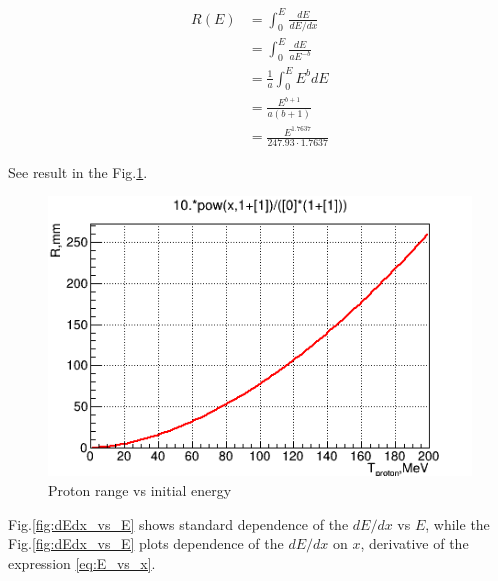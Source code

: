 \documentclass[english]{article}
\makeatletter
\def\ScaleIfNeeded{%
\ifdim\Gin@nat@width>\linewidth
\linewidth
\else
\Gin@nat@width
\fi
}
\makeatother
\begin{document}
\begin{align*}
R(E) &= \int_0^E \frac{dE}{dE/dx} \\
&= \int_0^E\frac{dE}{aE^{-b}} \\
&= \frac{1}{a} \int_0^E E^b dE \\
&= \frac{E^{b+1}}{a(b+1)} \\
&= \frac{E^{1.7637}}{247.93 \cdot 1.7637}
\end{align*}

See result in the Fig.\ref{fig:Proton_Range}.

% 
% 

\begin{figure}[h]
\centering
\begin{minipage}[t]{1.0 \linewidth}
\includegraphics[width=\ScaleIfNeeded]{Proton_Range_vs_T}
\caption{Proton range vs initial energy}
\label{fig:Proton_Range}
\end{minipage}
\end{figure}

Fig.\ref{fig:dEdx_vs_E} shows standard dependence of the $dE/dx$ vs $E$, while the Fig.\ref{fig:dEdx_vs_E} plots dependence of the $dE/dx$ on $x$, derivative of the expression \ref{eq:E_vs_x}.


\end{document}
